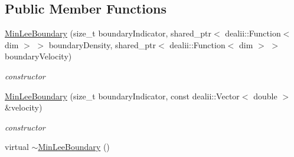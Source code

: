 \subsection*{Public Member Functions}
\begin{DoxyCompactItemize}
\item 
\hypertarget{classnatrium_1_1MinLeeBoundary_a1e9acd91ee2b97783932c4df45d38668}{\hyperlink{classnatrium_1_1MinLeeBoundary_a1e9acd91ee2b97783932c4df45d38668}{Min\-Lee\-Boundary} (size\-\_\-t boundary\-Indicator, shared\-\_\-ptr$<$ dealii\-::\-Function$<$ dim $>$ $>$ boundary\-Density, shared\-\_\-ptr$<$ dealii\-::\-Function$<$ dim $>$ $>$ boundary\-Velocity)}\label{classnatrium_1_1MinLeeBoundary_a1e9acd91ee2b97783932c4df45d38668}

\begin{DoxyCompactList}\small\item\em constructor \end{DoxyCompactList}\item 
\hypertarget{classnatrium_1_1MinLeeBoundary_a6bd31d48ffaf23ac74bc303b379b4ca8}{\hyperlink{classnatrium_1_1MinLeeBoundary_a6bd31d48ffaf23ac74bc303b379b4ca8}{Min\-Lee\-Boundary} (size\-\_\-t boundary\-Indicator, const dealii\-::\-Vector$<$ double $>$ \&velocity)}\label{classnatrium_1_1MinLeeBoundary_a6bd31d48ffaf23ac74bc303b379b4ca8}

\begin{DoxyCompactList}\small\item\em constructor \end{DoxyCompactList}\item 
\hypertarget{classnatrium_1_1MinLeeBoundary_ab2409b8dceb378d7e2bdb457e8c5f374}{virtual \hyperlink{classnatrium_1_1MinLeeBoundary_ab2409b8dceb378d7e2bdb457e8c5f374}{$\sim$\-Min\-Lee\-Boundary} ()}\label{classnatrium_1_1MinLeeBoundary_ab2409b8dceb378d7e2bdb457e8c5f374}


\end{DoxyCompactItemize}

